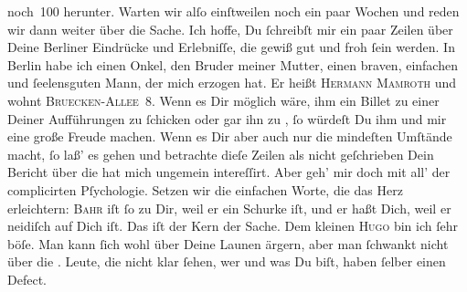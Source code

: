 \begin{ledgroupsized}[t]{13cm}
               noch 100 herunter. Warten wir alſo einſtweilen noch ein paar Wochen\strikeout{\textcolor{gray}{n}} und reden wir dann weiter über die Sache.\pend
           \pstart
           Ich hoffe, Du ſchreibſt mir ein paar Zeilen über Deine Berliner Eindrücke und Erlebniſſe, die gewiß gut und froh ſein werden. In
                  Berlin habe ich einen Onkel, den Bruder meiner Mutter, einen braven, einfachen und  ſeelensguten {\pb}Mann\strikeout{\textcolor{gray}{e}}, der mich erzogen hat. Er heißt \textsc{Hermann Mamroth} und wohnt \textsc{Bruecken-Allee} 8. Wenn es Dir möglich wäre, ihm ein
               Billet zu einer Deiner Aufführungen zu ſchicken oder gar ihn zu \label{K_L02766-9v}\label{K_L02766-9h}, ſo würdeſt  Du ihm und mir eine große Freude machen. Wenn es Dir
               aber auch nur die mindeſten Umſtände macht, ſo laß’  es gehen {\pb}und betrachte dieſe Zeilen
               als nicht geſchrieben{\dotsfive}\pend
           \pstart
           Dein Bericht über die \label{K_L02766-10v}\label{K_L02766-10h} hat mich ungemein intereſſirt. Aber geh’ mir doch mit all’ der complicirten
               Pſychologie. Setzen wir die einfachen Worte, die das Herz erleichtern: \textsc{Bahr} iſt ſo zu Dir,  weil er ein Schurke iſt,
               und er haßt Dich, weil er neidiſch auf Dich iſt. Das iſt der Kern der Sache. Dem
               kleinen {\pb}\textsc{Hugo} bin ich ſehr böſe. Man kann ſich wohl über Deine  Launen ärgern, aber man ſchwankt nicht über die \label{K_L02766-11v}\label{K_L02766-11h}. Leute, die nicht klar ſehen, wer und was Du biſt, haben ſelber einen Defect.

\end{ledgroupsized}
